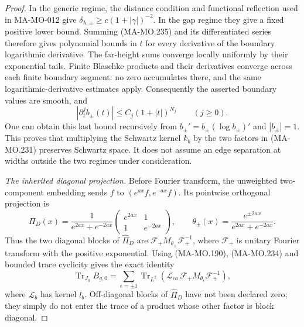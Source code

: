 \begin{proof}
In the generic regime, the distance condition and functional
reflection used in MA-MO-012 give
\(\delta_{\lambda,\pm}\ge c(1+|\gamma|)^{-2}\).
In the gap regime they give a fixed positive lower bound.
Summing (MA-MO.235) and its differentiated series therefore
gives polynomial bounds in \(t\) for every derivative of
the boundary logarithmic derivative.  The far-height sums
converge locally uniformly by their exponential tails.
Finite Blaschke products and their derivatives converge
across each finite boundary segment: no zero accumulates
there, and the same logarithmic-derivative estimates apply.
Consequently the asserted boundary values are smooth, and
\[
        |\partial_t^j b_\pm(t)|
           \le C_j(1+|t|)^{N_j}\qquad(j\ge0).
 \tag{MA-MO.236}
\]
One can obtain this last bound recursively from
\(b_\pm'=b_\pm(\log b_\pm)'\) and \(|b_\pm|=1\).
This proves that multiplying the Schwartz kernel \(k_b\)
by the two factors in (MA-MO.231) preserves Schwartz
space.  It does not assume an edge separation at widths
outside the two regimes under consideration.

\emph{The inherited diagonal projection.}
Before Fourier transform, the unweighted two-component
embedding sends \(f\) to \((e^{ax}f,e^{-ax}f)\).
Its pointwise orthogonal projection is
\[
 \Pi_D(x)=\frac1{e^{2ax}+e^{-2ax}}
       \begin{pmatrix}e^{2ax}&1\\1&e^{-2ax}\end{pmatrix},
 \qquad
 \theta_\pm(x)=\frac{e^{\pm2ax}}{e^{2ax}+e^{-2ax}}.
 \tag{MA-MO.237}
\]
Thus the two diagonal blocks of \(\widehat\Pi_D\) are
\(\mathcal F_+M_{\theta_\pm}\mathcal F_+^{-1}\), where
\(\mathcal F_+\) is unitary Fourier transform with the
positive exponential.  Using (MA-MO.190), (MA-MO.234)
and bounded trace cyclicity gives the exact identity
\[
 \operatorname{Tr}_{J_0}B_{g,0}
   =\sum_{\epsilon=\pm1}
       \operatorname{Tr}_{L^2}\!\left(
          \mathcal L_{\epsilon a}\,
          \mathcal F_+M_{\theta_\epsilon}\mathcal F_+^{-1}
                                \right),
 \tag{MA-MO.238}
\]
where \(\mathcal L_b\) has kernel \(l_b\).  Off-diagonal
blocks of \(\widehat\Pi_D\) have not been declared zero;
they simply do not enter the trace of a product whose
other factor is block diagonal.


\end{proof}
